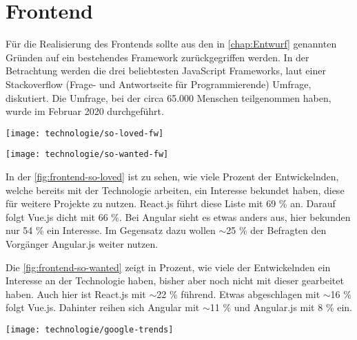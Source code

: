 \section{Frontend} \label{sec:Frontend}
Für die Realisierung des Frontends sollte aus den in \autoref{chap:Entwurf} genannten Gründen auf ein bestehendes Framework zurückgegriffen werden. In der Betrachtung werden die drei beliebtesten JavaScript Frameworks, laut einer Stackoverflow (Frage- und Antwortseite für Programmierende) Umfrage, diskutiert. Die Umfrage, bei der circa 65.000 Menschen teilgenommen haben, wurde im Februar 2020 durchgeführt. \cite{stackexchangeStackOverflowDeveloper2020}

\begin{center}
	\texttt{[image: technologie/so-loved-fw]}
	\label{fig:frontend-so-loved}
\end{center}

\begin{center}
	\texttt{[image: technologie/so-wanted-fw]}
	\label{fig:frontend-so-wanted}
\end{center}

In der \autoref{fig:frontend-so-loved} ist zu sehen, wie viele Prozent der Entwickelnden, welche bereits mit der Technologie arbeiten, ein Interesse bekundet haben, diese für weitere Projekte zu nutzen. React.js führt diese Liste mit 69 \% an. Darauf folgt Vue.js dicht mit 66 \%. Bei Angular sieht es etwas anders aus, hier bekunden nur 54 \% ein Interesse. Im Gegensatz dazu wollen $\sim$25 \% der Befragten den Vorgänger Angular.js weiter nutzen.

Die \autoref{fig:frontend-so-wanted} zeigt in Prozent, wie viele der Entwickelnden ein Interesse an der Technologie haben, bisher aber noch nicht mit dieser gearbeitet haben. Auch hier ist React.js mit $\sim$22 \% führend. Etwas abgeschlagen mit $\sim$16 \% folgt Vue.js. Dahinter reihen sich Angular mit $\sim$11 \% und Angular.js mit 8 \% ein.

\begin{center}
	\texttt{[image: technologie/google-trends]}
	\label{fig:frontend-google-trends}
\end{center}

